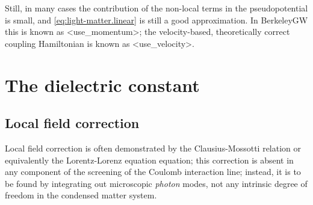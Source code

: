 \documentclass[hyperref, a4paper, 12pt]{report}
\def\texttt#1{<#1>}%
\newcommand{\shortcode}[1]{\texttt{#1}}
\begin{document}
Still, in many cases the contribution of the non-local terms 
in the pseudopotential is small,
and \eqref{eq:light-matter.linear} is still a good approximation.
In BerkeleyGW this is known as \shortcode{use_momentum};
the velocity-based, theoretically correct coupling Hamiltonian 
is known as \shortcode{use_velocity}. 

\section{The dielectric constant}

\subsection{Local field correction}

Local field correction is often demonstrated by the Clausius-Mossotti relation 
or equivalently the Lorentz-Lorenz equation equation;
this correction is absent in any component 
of the screening of the Coulomb interaction line;
instead, it is to be found by integrating out 
microscopic \emph{photon} modes, 
not any intrinsic degree of freedom 
in the condensed matter system.
\end{document}
